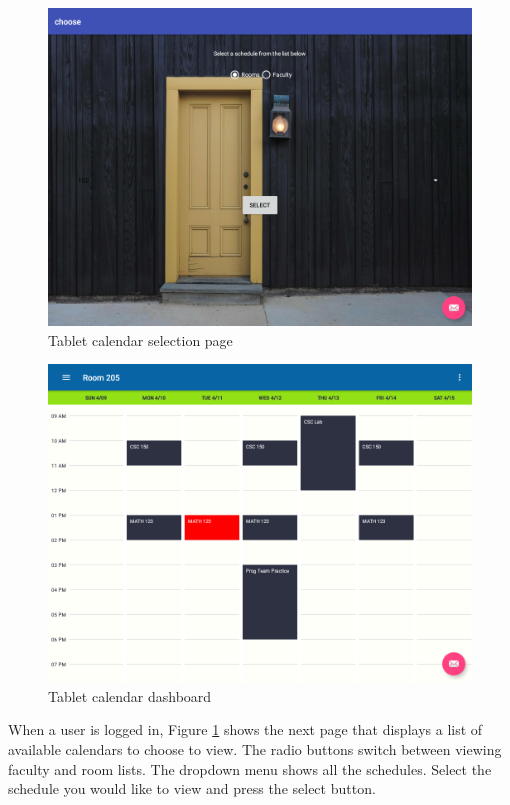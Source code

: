 \begin{figure}
\centering
  \includegraphics[scale=0.3]{selection_final.png}
  \caption{Tablet calendar selection page}
  \label{selection}
\end{figure}

\begin{figure}
\centering
  \includegraphics[scale=0.3]{dashboard_final.png}
  \caption{Tablet calendar dashboard}
  \label{dashboard}
\end{figure}

When a user is logged in, Figure \ref{selection} shows the next page that displays a list of available calendars to choose to view.  The radio buttons switch between viewing faculty and room lists.  The dropdown menu shows all the schedules.  Select the schedule you would like to view and press the select button.

